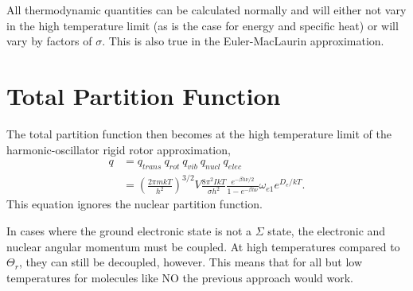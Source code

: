 All thermodynamic quantities can be calculated normally and will either not vary
in the high temperature limit (as is the case for energy and specific heat) or
will vary by factors of $\sigma$. This is also true in the Euler-MacLaurin
approximation.

\section{Total Partition Function}%
\label{sec:tpf}
The total partition function then becomes at the high temperature limit of the
harmonic-oscillator rigid rotor approximation,
\begin{align*}
	q &= q_{trans}~q_{rot}~q_{vib}~q_{nucl}~q_{elec}\\
	  &= \left(\frac{2\pi mkT}{h^2 }\right)^{3/2} V \frac{8\pi^2 IkT}{\sigma
	  h^{2}} \frac{e^{-\beta h\nu/2}}{1 - e^{-\beta h\nu}} \omega_{e1}
		  e^{D_e/kT}.
\end{align*}
This equation ignores the nuclear partition function.

\note In cases where the ground electronic state is not a $\Sigma$ state, the
electronic and nuclear angular momentum must be coupled. At high temperatures
compared to $\Theta_r$, they can still be decoupled, however. This means that
for all but low temperatures for molecules like NO the previous approach would
work.
